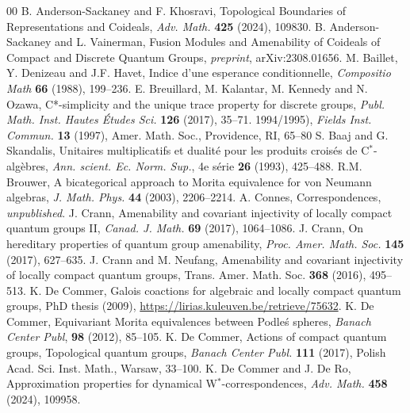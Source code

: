 \documentclass[reqno]{amsart}
\numberwithin{equation}{section}
\begin{document}
\begin{thebibliography}{00}
 B. Anderson-Sackaney and F. Khosravi, Topological Boundaries of Representations and Coideals, \emph{Adv. Math.} 
\textbf{425} (2024), 109830.
 B. Anderson-Sackaney and L. Vainerman, Fusion Modules and Amenability of Coideals of Compact and Discrete Quantum Groups, \emph{preprint}, arXiv:2308.01656.
 M. Baillet, Y. Denizeau and J.F. Havet, Indice d'une esperance conditionnelle, \emph{Compositio Math} \textbf{66} (1988), 199--236.
 E. Breuillard, M. Kalantar, M. Kennedy and N. Ozawa, C*-simplicity and the unique trace property for discrete groups, \emph{Publ. Math. Inst. Hautes \'Etudes Sci.} \textbf{126} (2017), 35--71.
              1994/1995), \emph{Fields Inst. Commun.} \textbf{13} (1997), Amer. Math. Soc., Providence, RI, 65--80
 S. Baaj and G. Skandalis, Unitaires multiplicatifs et dualit\'{e} pour les produits crois\'{e}s de C$^*$-alg\`{e}bres, \emph{Ann. scient. Ec. Norm. Sup.}, 4e s\'{e}rie \textbf{26} (1993), 425--488.
 R.M. Brouwer, A bicategorical approach to Morita equivalence for von Neumann algebras, \emph{J. Math. Phys.} \textbf{44} (2003), 2206--2214.
 A. Connes, Correspondences, \emph{unpublished}.
 J. Crann, Amenability and covariant injectivity of locally compact quantum groups {II}, \emph{Canad. J. Math.} \textbf{69} (2017), 1064--1086.
 J. Crann, On hereditary properties of quantum group amenability, \emph{Proc. Amer. Math. Soc.} \textbf{145} (2017), 627--635.
 J. Crann and M. Neufang, Amenability and covariant injectivity of locally compact quantum groups, Trans. Amer. Math. Soc. \textbf{368} (2016), 495--513.
 K. De Commer, Galois coactions for algebraic and locally compact quantum groups, PhD thesis (2009), \url{https://lirias.kuleuven.be/retrieve/75632}.
 K. De Commer, Equivariant Morita equivalences between Podleś spheres, \emph{Banach Center Publ}, \textbf{98} (2012), 85--105.
 K. De Commer, Actions of compact quantum groups, Topological quantum groups, \textit{Banach Center Publ.} \textbf{111} (2017), Polish Acad. Sci. Inst. Math., Warsaw, 33--100.
 K. De Commer and J. De Ro, Approximation properties for dynamical W$^*$-correspondences, \emph{Adv. Math.} \textbf{458} (2024), 109958.

\end{thebibliography}
\end{document}
